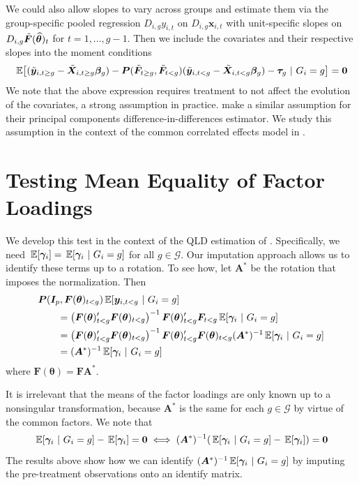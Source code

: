 \documentclass[12pt]{article}
\begin{document}
We could also allow slopes to vary across groups and estimate them via the group-specific pooled regression $D_{i,g} y_{i,t}$ on $D_{i,g} \bm x_{i,t}$ with unit-specific slopes on $D_{i,g} \Tilde{\bm{F}}(\widehat{\bm{\theta}})_t$ for $t = 1,..., g-1$. Then we include the covariates and their respective slopes into the moment conditions
\begin{equation}
    \expec{(\tilde{\bm y}_{i,t\geq g} - \tilde{\bm X}_{i, t \geq g} \bm \beta_g) - \bm P(\tilde{\bm{F}}_{t \geq g}, \tilde{\bm{F}}_{t < g}) (\tilde{\bm y}_{i,t< g} - \tilde{\bm X}_{i, t < g} \bm \beta_g) - \bm \tau_g  }{G_i = g} = \bm 0
\end{equation}
We note that the above expression requires treatment to not affect the evolution of the covariates, a strong assumption in practice. \citet{Chan_and_Kwok_2022} make a similar assumption for their principal components difference-in-differences estimator. We study this assumption in the context of the common correlated effects model in \citet{Brown_Butts_Westerlund_2023}.


\section{Testing Mean Equality of Factor Loadings}

We develop this test in the context of the QLD estimation of \citet{Ahn_Lee_Schmidt_2013}. Specifically, we need $\expec{\bm \gamma_i} = \expec{\bm \gamma_i}{G_i = g}$ for all $g \in \mathcal{G}$. Our imputation approach allows us to identify these terms up to a rotation. To see how, let $\bm A^*$ be the rotation that imposes the \citet{Ahn_Lee_Schmidt_2013} normalization. Then
\begin{align*}
    &\bm P(\bm I_{p}, \bm{F}(\bm{\theta})_{t < g}) \expec{\bm y_{i, t < g}}{G_i = g} \\
    &\qquad= \left( \bm{F}(\bm{\theta})_{t < g}' \bm{F}(\bm{\theta})_{t < g} \right)^{-1} \bm{F}(\bm{\theta})_{t < g}' \bm{F}_{t < g} \expec{\bm \gamma_i}{G_i = g} \\
    &\qquad= \left( \bm{F}(\bm{\theta})_{t < g}' \bm{F}(\bm{\theta})_{t < g} \right)^{-1} \bm{F}(\bm{\theta})_{t < g}' \bm{F}(\bm{\theta})_{t < g} (\bm A^*)^{-1} \expec{\bm \gamma_i}{G_i = g} \\
    &\qquad= (\bm A^*)^{-1} \expec{\bm \gamma_i}{G_i = g}
\end{align*}
where $\bm{F}(\bm{\theta}) = \bm{F} \bm A^*$.

It is irrelevant that the means of the factor loadings are only known up to a nonsingular transformation, because $\bm A^*$ is the same for each $g \in \mathcal{G}$ by virtue of the common factors. We note that
\begin{equation}
    \expec{\bm \gamma_i}{G_i = g} - \expec{\bm \gamma_i} = \bm 0 \iff (\bm A^*)^{-1}(\expec{\bm \gamma_i}{G_i = g} - \expec{\bm \gamma_i}) = \bm 0
\end{equation}
The results above show how we can identify $(\bm A^*)^{-1} \expec{\bm \gamma_i}{G_i = g}$ by imputing the pre-treatment observations onto an identify matrix. 
\end{document}
